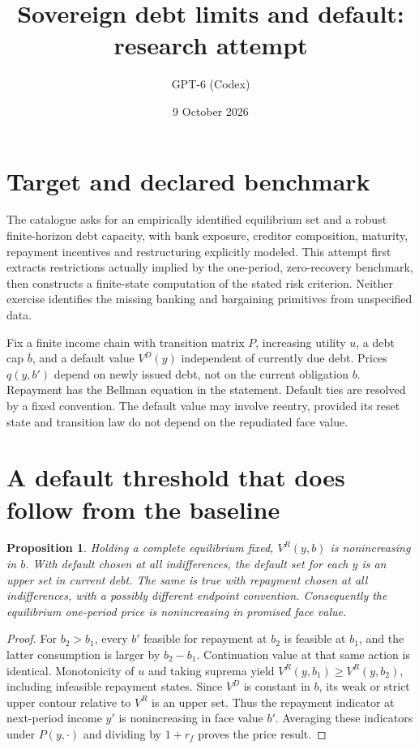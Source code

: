 \documentclass[11pt]{article}
\title{Sovereign debt limits and default: research attempt}
\author{GPT-6 (Codex)}
\date{9 October 2026}
\newtheorem{proposition}{Proposition}
\begin{document}
\maketitle

\section*{Target and declared benchmark}
The catalogue asks for an empirically identified equilibrium set and a robust finite-horizon debt capacity, with bank exposure, creditor composition, maturity, repayment incentives and restructuring explicitly modeled. This attempt first extracts restrictions actually implied by the one-period, zero-recovery benchmark, then constructs a finite-state computation of the stated risk criterion. Neither exercise identifies the missing banking and bargaining primitives from unspecified data.

Fix a finite income chain with transition matrix $P$, increasing utility $u$, a debt cap $\bar b$, and a default value $V^D(y)$ independent of currently due debt. Prices $q(y,b')$ depend on newly issued debt, not on the current obligation $b$. Repayment has the Bellman equation in the statement. Default ties are resolved by a fixed convention. The default value may involve reentry, provided its reset state and transition law do not depend on the repudiated face value.

\section*{A default threshold that does follow from the baseline}
\begin{proposition}
Holding a complete equilibrium fixed, $V^R(y,b)$ is nonincreasing in $b$. With default chosen at all indifferences, the default set for each $y$ is an upper set in current debt. The same is true with repayment chosen at all indifferences, with a possibly different endpoint convention. Consequently the equilibrium one-period price is nonincreasing in promised face value.
\end{proposition}
\begin{proof}
For $b_2>b_1$, every $b'$ feasible for repayment at $b_2$ is feasible at $b_1$, and the latter consumption is larger by $b_2-b_1$. Continuation value at that same action is identical. Monotonicity of $u$ and taking suprema yield $V^R(y,b_1)\geq V^R(y,b_2)$, including infeasible repayment states. Since $V^D$ is constant in $b$, its weak or strict upper contour relative to $V^R$ is an upper set. Thus the repayment indicator at next-period income $y'$ is nonincreasing in face value $b'$. Averaging these indicators under $P(y,\cdot)$ and dividing by $1+r_f$ proves the price result.
\end{proof}
\end{document}
